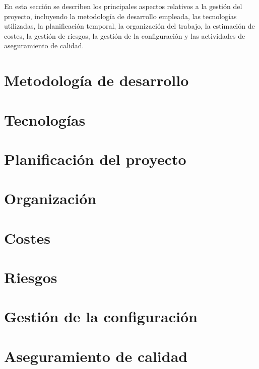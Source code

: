 En esta sección se describen los principales aspectos relativos a la gestión del proyecto, incluyendo la metodología de desarrollo empleada, las tecnologías utilizadas, la planificación temporal, la organización del trabajo, la estimación de costes, la gestión de riesgos, la gestión de la configuración y las actividades de aseguramiento de calidad.

\section{Metodología de desarrollo}
\label{sec:methodology}


\section{Tecnologías}
\label{sec:technologies}


\section{Planificación del proyecto}
\label{sec:planning}


\section{Organización}
\label{sec:project-organization}


\section{Costes}
\label{sec:costs}


\section{Riesgos}
\label{sec:risks}


\section{Gestión de la configuración}
\label{sec:configuration}


\section{Aseguramiento de calidad}
\label{sec:quality}

